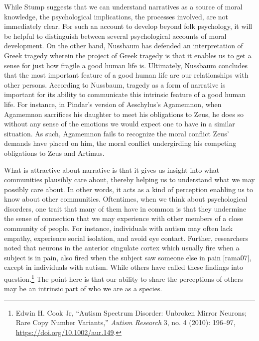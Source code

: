\documentclass[
  12pt,
]{book}
\theoremstyle{definition}
\theoremstyle{definition}
\theoremstyle{definition}
\theoremstyle{definition}
\theoremstyle{remark}
\begin{document}
While Stump suggests that we can understand narratives as a source of moral knowledge, the psychological implications, the processes involved, are not immediately clear. For such an account to develop beyond folk psychology, it will be helpful to distinguish between several psychological accounts of moral development. On the other hand, Nussbaum has defended an interpretation of Greek tragedy wherein the project of Greek tragedy is that it enables us to get a sense for just how fragile a good human life is. Ultimately, Nussbaum concludes that the most important feature of a good human life are our relationships with other persons. According to Nussbaum, tragedy as a form of narrative is important for its ability to communicate this intrinsic feature of a good human life. For instance, in Pindar's version of Aeschylus's Agamemnon, when Agamemnon sacrifices his daughter to meet his obligations to Zeus, he does so without any sense of the emotions we would expect one to have in a similar situation. As such, Agamemnon fails to recognize the moral conflict Zeus' demands have placed on him, the moral conflict undergirding his competing obligations to Zeus and Artimus.

What is attractive about narrative is that it gives us insight into what communities plausibly care about, thereby helping us to understand what we may possibly care about. In other words, it acts as a kind of perception enabling us to know about other communities. Oftentimes, when we think about psychological disorders, one trait that many of them have in common is that they undermine the sense of connection that we may experience with other members of a close community of people. For instance, individuals with autism may often lack empathy, experience social isolation, and avoid eye contact. Further, researchers noted that neurons in the anterior cingulate cortex which usually fire when a subject is in pain, also fired when the subject saw someone else in pain {[}rama07{]}, except in individuals with autism. While others have called these findings into question.\footnote{Edwin H. Cook Jr, {``Autism Spectrum Disorder: Unbroken Mirror Neurons; Rare Copy Number Variants,''} \emph{Autism Research} 3, no. 4 (2010): 196--97, \url{https://doi.org/10.1002/aur.149}.} The point here is that our ability to share the perceptions of others may be an intrinsic part of who we are as a species.
\end{document}
